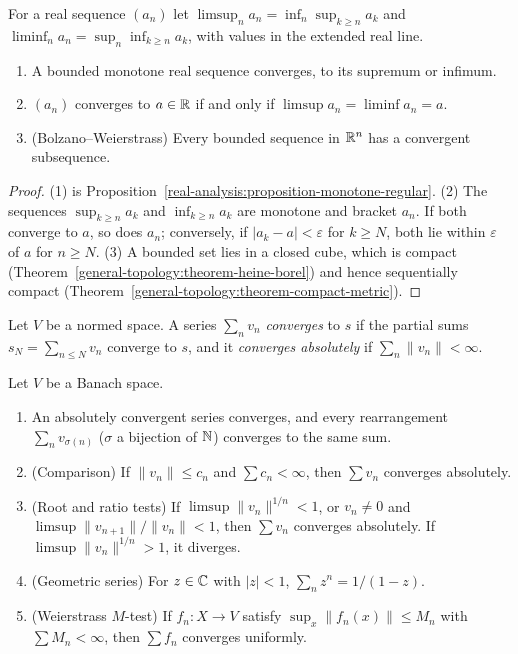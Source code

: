 \begin{definition}\label{real-analysis:definition-limsup}
For a real sequence $(a_n)$ let $\limsup_n a_n = \inf_n\sup_{k \geq n}a_k$ and $\liminf_n a_n = \sup_n\inf_{k \geq n}a_k$, with values in the extended real line.
\end{definition}

\begin{proposition}\label{real-analysis:proposition-monotone}
\begin{enumerate}
\item A bounded monotone real sequence converges, to its supremum or infimum.
\item $(a_n)$ converges to $a \in \mathbb{R}$ if and only if $\limsup a_n = \liminf a_n = a$.
\item (Bolzano--Weierstrass) Every bounded sequence in $\mathbb{R}^n$ has a convergent subsequence.
\end{enumerate}
\end{proposition}

\begin{proof}
(1) is Proposition~\ref{real-analysis:proposition-monotone-regular}. (2) The sequences $\sup_{k \geq n}a_k$ and $\inf_{k \geq n}a_k$ are monotone and bracket $a_n$. If both converge to $a$, so does
$a_n$; conversely, if $|a_k - a| < \varepsilon$ for $k \geq N$, both lie within $\varepsilon$ of $a$ for $n \geq N$. (3) A bounded set lies in a closed cube, which is compact
(Theorem~\ref{general-topology:theorem-heine-borel}) and hence sequentially compact (Theorem~\ref{general-topology:theorem-compact-metric}).
\end{proof}

\begin{definition}\label{real-analysis:definition-series}
Let $V$ be a normed space. A series $\sum_n v_n$ \emph{converges} to $s$ if the partial sums $s_N = \sum_{n \leq N}v_n$ converge to $s$, and it \emph{converges absolutely}
if $\sum_n\|v_n\| < \infty$.
\end{definition}

\begin{proposition}\label{real-analysis:proposition-series}
Let $V$ be a Banach space.
\begin{enumerate}
\item An absolutely convergent series converges, and every rearrangement $\sum_n v_{\sigma(n)}$ ($\sigma$ a bijection of $\mathbb{N}$) converges to the same sum.
\item (Comparison) If $\|v_n\| \leq c_n$ and $\sum c_n < \infty$, then $\sum v_n$ converges absolutely.
\item (Root and ratio tests) If $\limsup\|v_n\|^{1/n} < 1$, or $v_n \neq 0$ and $\limsup\|v_{n+1}\|/\|v_n\| < 1$, then $\sum v_n$ converges absolutely. If $\limsup\|v_n\|^{1/n} > 1$, it
diverges.
\item (Geometric series) For $z \in \mathbb{C}$ with $|z| < 1$, $\sum_n z^n = 1/(1 - z)$.
\item (Weierstrass $M$-test) If $f_n \colon X \to V$ satisfy $\sup_x\|f_n(x)\| \leq M_n$ with $\sum M_n < \infty$, then $\sum f_n$ converges uniformly.
\end{enumerate}
\end{proposition}

